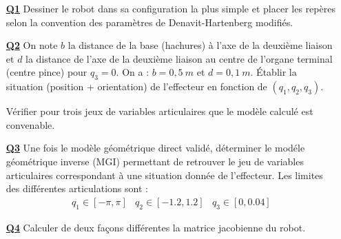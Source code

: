 \documentclass[12pt,a4paper]{article}
\begin{document}
\begin{itemize}
  
%   
%   
  \medskip\item[\textbf{\underline{Q1}}] Dessiner le robot dans sa configuration la plus simple et
  placer les repères selon la convention des paramètres de Denavit-Hartenberg modifiés.

  \medskip\item[\textbf{\underline{Q2}}] On note $b$ la distance de la
  base (hachures) à l'axe de la deuxième liaison et  $d$ la distance de l'axe de la deuxième liaison au centre de
  l'organe terminal (centre pince) pour $q_3=0$. On a : $b=0,5 \ m$ et  $d=0,1 \ m$.
  Établir la situation (position + orientation) de l'effecteur en fonction de $(q_1,q_2,q_3)$.
  
  Vérifier pour trois jeux de variables articulaires que le modèle calculé est convenable.

  \medskip\item[\textbf{\underline{Q3}}] Une fois le modèle géométrique direct validé, déterminer le modéle géométrique inverse (MGI) permettant de retrouver le jeu de variables articulaires correspondant à une situation donnée de l'effecteur. Les limites des différentes articulations sont :
  \begin{equation*}
  \begin{array}{ccc}
  q_1\in[-\pi,\pi] & q_2 \in [-1.2,1.2] & q_3\in[0,0.04]
  \end{array}
  \end{equation*}
  
  \medskip\item[\textbf{\underline{Q4}}] Calculer de deux façons différentes la matrice jacobienne du robot.
  
\end{itemize}
\end{document}

